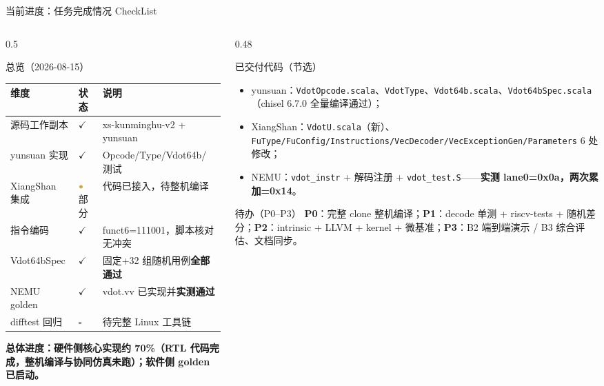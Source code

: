 \documentclass[aspectratio=169]{beamer}
\newcommand{\smalltable}[1]{\par\centering\scriptsize #1\par}
\begin{document}
\begin{frame}{当前进度：任务完成情况 CheckList}
\vspace{-0.45em}
\begin{columns}[T]
\begin{column}{0.5\textwidth}
\begin{block}{总览（2026-08-15）}
\smalltable{%
\begin{tabular}{@{}lll@{}}
\toprule
维度 & 状态 & 说明 \\
\midrule
源码工作副本 & $\checkmark$ & xs-kunminghu-v2 + yunsuan \\
yunsuan 实现 & $\checkmark$ & Opcode/Type/Vdot64b/测试 \\
XiangShan 集成 & $\textcolor{GoldAccent}{\bullet}$ 部分 & 代码已接入，待整机编译 \\
指令编码 & $\checkmark$ & funct6=111001，脚本核对无冲突 \\
Vdot64bSpec & $\checkmark$ & 固定+32 组随机用例\textbf{全部通过} \\
NEMU golden & $\checkmark$ & vdot.vv 已实现并\textbf{实测通过} \\
difftest 回归 & $\square$ & 待完整 Linux 工具链 \\
\bottomrule
\end{tabular}}
\end{block}
\textbf{总体进度：硬件侧核心实现约 70\%（RTL 代码完成，整机编译与协同仿真未跑）；软件侧 golden 已启动。}
\end{column}
\begin{column}{0.48\textwidth}
\begin{block}{已交付代码（节选）}
\begin{itemize}
  \item yunsuan：\texttt{VdotOpcode.scala}、\texttt{VdotType}、\texttt{Vdot64b.scala}、\texttt{Vdot64bSpec.scala}（chisel 6.7.0 全量编译通过）；
  \item XiangShan：\texttt{VdotU.scala}（新）、\texttt{FuType/FuConfig/Instructions/VecDecoder/VecExceptionGen/Parameters} 6 处修改；
  \item NEMU：\texttt{vdot\_instr} + 解码注册 + \texttt{vdot\_test.S}——\textbf{实测 lane0=0x0a，两次累加=0x14}。
\end{itemize}
\end{block}
\begin{block}{待办（P0–P3）}
\textbf{P0}：完整 clone 整机编译；\textbf{P1}：decode 单测 + riscv-tests + 随机差分；\textbf{P2}：intrinsic + LLVM + kernel + 微基准；\textbf{P3}：B2 端到端演示 / B3 综合评估、文档同步。
\end{block}
\end{column}
\end{columns}
\end{frame}
\end{document}
